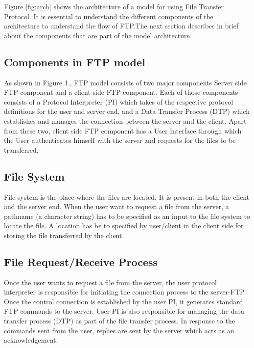 \documentclass[9pt,twocolumn,twoside]{styles/osajnl}
\begin{document}
Figure \ref{fig:arch} shows the architecture of a model for using File Transfer Protocol. It is essential to understand the different components of the architecture to understand the flow of FTP.The next section describes in brief about the components that are part of the model architecture.

\subsection{Components in FTP model}
As shown in Figure 1., FTP model consists of two major components Server side FTP component and a client side FTP component. Each of those components consists of a Protocol Interpreter (PI) which takes of the respective protocol definitions for the user and server end, and a Data Transfer Process (DTP) which establishes and manages the connection between the server and the client. Apart from these two, client side FTP component has a User Interface through which the User authenticates himself with the server and requests for the files to be transferred.

\subsection{File System}
File system is the place where the files are located. It is present in both the client and the server end. When the user want to request a file from the server, a pathname (a character string) has to be specified as an input to the file system to locate the file. A location has be to specified by user/client in the client side for storing the file transferred by the client. 

\subsection{File Request/Receive Process}
Once the user wants to request a file from the server, the user protocol interpreter is responsible for initiating the connection process to the server-FTP. Once the control connection is established by the user PI, it generates standard FTP commands to the server. User PI is also responsible for managing the data transfer process (DTP) as part of the file transfer process. In response to the commands sent from the user, replies are sent by the server which acts as an acknowledgement.\\
\end{document}
